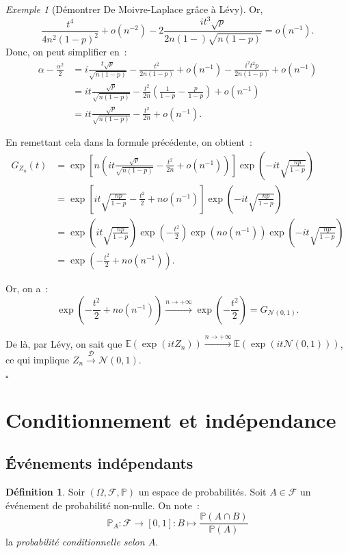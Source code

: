 \documentclass{article}
\newcommand{\E}{\mathbb E}
\renewcommand{\P}{\mathbb P}
\newcommand{\Nzu}{\mathcal N(0, 1)}  %
\newcommand{\convl}{\stackrel{\mathcal D}\to}  %
\newcommand{\espproba}[3]{\left(#1, #2, #3\right)}  %
\newcommand{\Ofp}{\espproba \Omega{\mathcal F}\P}  %
\theoremstyle{definition}
\newtheorem{déf}[thm]{Définition}
\theoremstyle{remark}
\newtheorem{ex}{Exemple}
\begin{document}
\begin{ex}[Démontrer De Moivre-Laplace grâce à Lévy]
		Or,
		\[\frac {t^4}{4n^2(1-p)^2} + o(n^{-2}) - 2\frac {it^3\sqrt p}{2n(1-)\sqrt {n(1-p)}} = o(n^{-1}).\]
		Donc, on peut simplifier en~:
		\begin{align*}
			\alpha - \frac {\alpha^2}2 &= i\frac {t\sqrt p}{\sqrt{n(1-p)}} - \frac {t^2}{2n(1-p)} + o(n^{-1}) - \frac {i^2t^2p}{2n(1-p)} + o(n^{-1}) \\
			                           &= it\frac {\sqrt p}{\sqrt{n(1-p)}} - \frac {t^2}{2n}\left(\frac 1{1-p} - \frac p{1-p}\right) + o(n^{-1}) \\
			                           &= it\frac {\sqrt p}{\sqrt{n(1-p)}} - \frac {t^2}{2n} + o(n^{-1}).
		\end{align*}

		En remettant cela dans la formule précédente, on obtient~:
		\begin{align*}
			G_{Z_n}(t) &= \exp\left[n\left(it\frac {\sqrt p}{\sqrt{n(1-p)}} - \frac {t^2}{2n} + o(n^{-1})\right)\right]\exp\left(-it\sqrt{\frac {np}{1-p}}\right) \\
			           &= \exp\left[it\sqrt{\frac {np}{1-p}} - \frac {t^2}2 + no(n^{-1})\right]\exp\left(-it\sqrt {\frac {np}{1-p}}\right) \\
			           &= \exp\left(it\sqrt{\frac {np}{1-p}}\right)\exp\left(-\frac {t^2}2\right)\exp(no(n^{-1}))\exp\left(-it\sqrt {\frac {np}{1-p}}\right) \\
					   &= \exp\left(-\frac {t^2}2 + no(n^{-1})\right).
		\end{align*}

		Or, on a~:
		\[\exp\left(-\frac {t^2}2 + no(n^{-1})\right) \stackrel{n \to +\infty}\to \exp\left(-\frac {t^2}2\right) = G_{\Nzu}.\]

		De là, par Lévy, on sait que $\E(\exp(itZ_n)) \stackrel{n \to +\infty}\to \E(\exp(it\Nzu))$, ce qui implique $Z_n \convl \Nzu$.

		\begin{flushright} $\square$ \end{flushright}
		\end{ex}

\newpage
\section{Conditionnement et indépendance}
	\subsection{Événements indépendants}
		\begin{déf} Soir $\Ofp$ un espace de probabilités. Soit $A \in \mathcal F$ un événement de probabilité non-nulle. On note~:
		\[\P_A : \mathcal F \to [0, 1] : B \mapsto \frac {\P(A \cap B)}{\P(A)}\]
		la \emph{probabilité conditionnelle selon $A$}. \end{déf}
\end{document}
